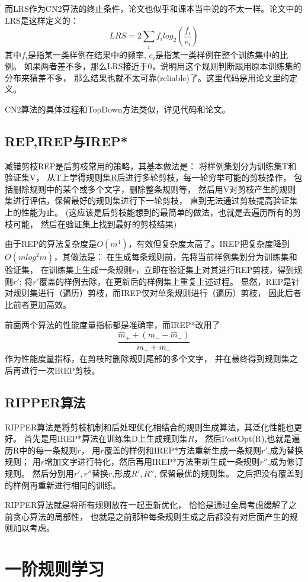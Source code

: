 \documentclass[UTF8]{article}
\begin{document}
    而LRS作为CN2算法的终止条件，论文也似乎和课本当中说的不太一样。论文中的LRS是这样定义的：
    \begin{equation}
        LRS = 2\sum_i f_i log_2(\dfrac{f_i}{e_i})
    \end{equation}
    其中$f_i$是指某一类样例在结果中的频率, $e_i$是指某一类样例在整个训练集中的比例。
    如果两者差不多，那么LRS接近于0，说明用这个规则判断跟用原本训练集的分布来猜差不多，
    那么结果也就不太可靠(reliable)了。这里代码是用论文里的定义。

    CN2算法的具体过程和TopDown方法类似，详见代码和论文。

\subsection{REP,IREP与IREP*}
    减错剪枝REP是后剪枝常用的策略，其基本做法是：
    将样例集划分为训练集T和验证集V，
    从T上学得规则集R后进行多轮剪枝，每一轮穷举可能的剪枝操作，
    包括删除规则中的某个或多个文字，删除整条规则等，
    然后用V对剪枝产生的规则集进行评估，保留最好的规则集进行下一轮剪枝，
    直到无法通过剪枝提高验证集上的性能为止。
    (这应该是后剪枝能想到的最简单的做法，也就是去遍历所有的剪枝可能，
    然后在验证集上找到最好的剪枝结果)

    由于REP的算法复杂度是$O(m^4)$，有效但复杂度太高了。IREP把复杂度降到$O(mlog^2m)$，其做法是：
    在生成每条规则前，先将当前样例集划分为训练集和验证集，
    在训练集上生成一条规则$r$，立即在验证集上对其进行REP剪枝，得到规则$r'$;
    将$r'$覆盖的样例去除，在更新后的样例集上重复上述过程。
    显然，REP是针对规则集进行（遍历）剪枝，而IREP仅对单条规则进行（遍历）剪枝，
    因此后者比前者更加高效。

    前面两个算法的性能度量指标都是准确率，而IREP*改用了
    $$\dfrac{\hat{m}_++(m_--\hat{m}_-)}{m_++m_-}$$
    作为性能度量指标，在剪枝时删除规则尾部的多个文字，
    并在最终得到规则集之后再进行一次IREP剪枝。

\subsection{RIPPER算法}
    RIPPER算法是将剪枝机制和后处理优化相结合的规则生成算法，其泛化性能也更好。
    首先是用IREP*算法在训练集D上生成规则集$R$，
    然后PostOpt(R),也就是遍历R中的每一条规则$r$，
    用$r$覆盖的样例和IREP*方法重新生成一条规则$r'$,成为替换规则；
    用$r$增加文字进行特化，然后再用IREP*方法重新生成一条规则$r''$,成为修订规则。
    然后分别用$r',r''$替换$r$,形成$R',R''$, 保留最优的规则集。
    之后把没有覆盖到的样例再重新进行相同的训练。

    RIPPER算法就是将所有规则放在一起重新优化，
    恰恰是通过全局考虑缓解了之前贪心算法的局部性，
    也就是之前那种每条规则生成之后都没有对后面产生的规则加以考虑。

\section{一阶规则学习}
\end{document}
